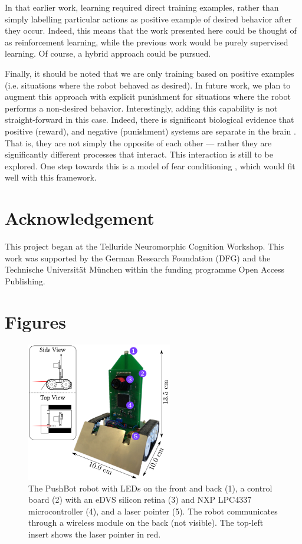 \documentclass{frontiersSCNS}
\begin{document}
In that earlier work, learning required direct training examples, rather than 
simply labelling particular actions as positive example of desired behavior 
after they occur.  Indeed, this means that the work presented here could be 
thought of as reinforcement learning, while the previous work would be purely 
supervised learning. Of course, a hybrid approach could be pursued. 

Finally, it should be noted that we are only training based on positive 
examples (i.e. situations where the robot behaved as desired). In future work,
we plan to augment this approach with explicit punishment for situations where 
the robot performs a non-desired behavior. Interestingly, adding this capability
is not straight-forward in this case.  Indeed, there is significant biological 
evidence that positive (reward), and negative (punishment) systems are separate 
in the brain \citep{boureau2010}. That is, they are not simply the opposite of 
each other --- rather they are significantly different processes that interact. 
This interaction is still to be explored. One step towards this is a model
of fear conditioning \citep	{kolbeck2013fear}, which would fit well with this framework.


\section*{Acknowledgement}

This project began at the Telluride Neuromorphic Cognition Workshop. 
This work was supported by the German Research Foundation (DFG) and the 
Technische Universit{\"a}t M{\"u}nchen within the funding programme Open Access Publishing.




\section*{Figures}

\begin{figure}[h!]
\centering
\includegraphics[width=2.5in]{../figures/Pushbot.png}
\caption{The PushBot robot with LEDs on the front and back (1), a control
board (2) with an eDVS silicon retina (3) and NXP LPC4337 microcontroller (4),
and a laser pointer (5).  The robot communicates through a wireless module on
the back (not visible).  The top-left insert shows the laser pointer in red.}
\label{fig_sim}
\end{figure}
\end{document}
